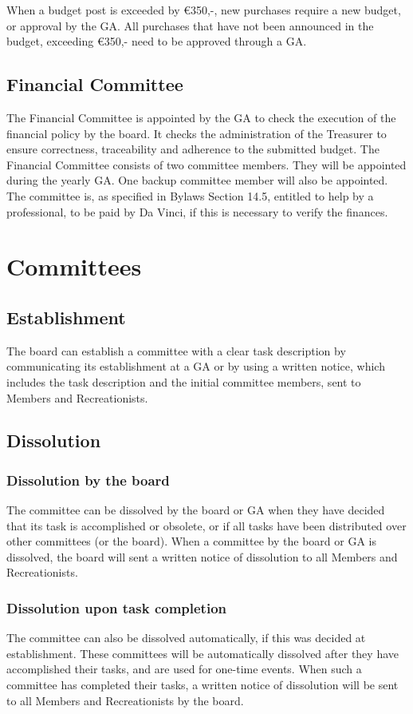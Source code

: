 \documentclass[a4paper]{article}
\newcommand{\Asta}{Bylaws} %
\begin{document}
When a budget post is exceeded by €350,-, new purchases require a new budget, or approval by the { GA}. All purchases that have not been announced in the budget, exceeding €350,- need to be approved through a { GA}.

\subsection{Financial Committee}
The Financial Committee is appointed by the { GA} to check the execution of the financial policy by the board. It checks the administration of the Treasurer to ensure correctness, traceability and adherence to the submitted budget. The Financial Committee consists of two committee members. They will be appointed during the yearly { GA}. One backup committee member will also be appointed. The committee is, as specified in { \Asta} Section 14.5, entitled to help by a professional, to be paid by Da Vinci, if this is necessary to verify the finances.

\section{Committees}
\subsection{Establishment}
The board can establish a committee with a clear task description by communicating its establishment at a { GA} or by using a written notice, which includes the task description and the initial committee members, sent to { Members} and { Recreationists}.

\subsection{Dissolution}
\subsubsection{Dissolution by the board}
The committee can be dissolved by the board or { GA} when they have decided that its task is accomplished or obsolete, or if all tasks have been distributed over other committees (or the board). When a committee by the board or { GA} is dissolved, the board will sent a written notice of dissolution to all { Members} and { Recreationists}.

\subsubsection{Dissolution upon task completion}
The committee can also be dissolved automatically, if this was decided at establishment. These committees will be automatically dissolved after they have accomplished their tasks, and are used for one-time events. When such a committee has completed their tasks, a written notice of dissolution will be sent to all { Members} and { Recreationists} by the board.
\end{document}
